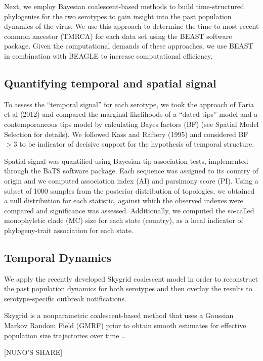\documentclass[10pt]{article}
\begin{document}
Next, we employ Bayesian coalescent-based methods to build time-structured phylogenies for the two serotypes to gain insight into the past population dynamics of the virus.
We use this approach to determine the time to most recent common ancestor (TMRCA) for each data set using the BEAST \cite{BEAST} software package.
 Given the computational demands of these approaches, we use BEAST \cite{BEAST} in combination with BEAGLE \cite{BEAGLE} to increase computational efficiency.


\subsection*{Quantifying temporal and spatial signal} 

To assess the ``temporal signal'' for each serotype, we took the approach of Faria et al (2012) \cite{Faria2012} and compared the marginal likelihoods of a ``dated tips'' model and a contemporaneous tips model by calculating Bayes factors (BF) \cite{Suchard2001,KassRaftery1995} (see Spatial Model Selection for details). We followed Kass and Raftery (1995) \cite{KassRaftery1995} and considered BF$>3$ to be indicator of decisive support for the hypothesis of temporal structure.

Spatial signal was quantified using Bayesian tip-association tests, implemented through the BaTS software package\cite{bats}. Each sequence was assigned to its country of origin and we computed association index (AI) and parsimony score (PI). Using a subset of 1000 samples from the posterior distribution of topologies, we obtained a null distribution for each statistic, against which the observed indexes were compared and significance was assessed. Additionally, we computed the so-called monophyletic clade (MC) size for each state (country), as a local indicator of phylogeny-trait association for each state.


\subsection*{Temporal Dynamics}

We apply the recently developed Skygrid coalescent model \cite{skygrid} in order to reconstruct the past population dynamics for both serotypes and then overlay the results to serotype-specific outbreak notifications.

Skygrid is a nonparametric coalescent-based method that uses a Gaussian Markov Random Field (GMRF) prior to obtain smooth estimates for effective population size trajectories over time \ldots 
\begin{center}
 [NUNO'S SHARE]
\end{center}
\end{document}
